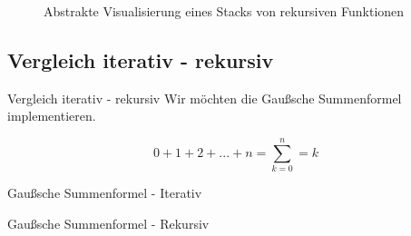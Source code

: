 \documentclass{../tuda-beamer}
\begin{document}
  \begin{frame}[c]
    \begin{figure}[h]
      \centering
      \caption{Abstrakte Visualisierung eines Stacks von rekursiven Funktionen}
    \end{figure}
  \end{frame}

  \subsection{Vergleich iterativ - rekursiv}
  \begin{frame}{Vergleich iterativ - rekursiv}
    Wir möchten die Gaußsche Summenformel implementieren.

    \begin{equation}
      0 + 1 + 2 + ... + n = \sum_{k = 0}^n = k
    \end{equation}
  \end{frame}

  \begin{frame}{Gaußsche Summenformel - Iterativ}
    
  \end{frame}

  \begin{frame}{Gaußsche Summenformel - Rekursiv}
    
  \end{frame}
\end{document}
